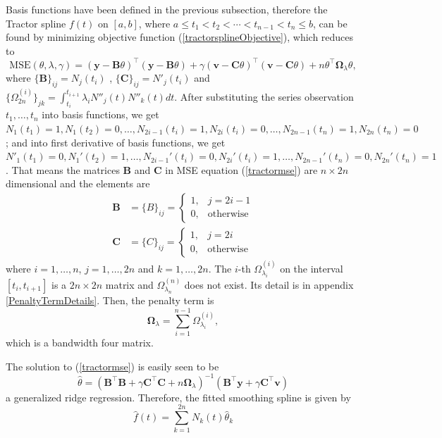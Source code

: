 Basis functions have been defined in the previous subsection, therefore the Tractor spline $f(t)$ on $[a,b]$, where $a \leq t_1 < t_2< \cdots < t_{n-1}<t_n \leq b$, can be found by minimizing  objective function (\ref{tractorsplineObjective}), which reduces to
\begin{equation}\label{tractormse}
\text{MSE}(\theta, \lambda,\gamma) = (\mathbf{y}-\mathbf{B}\theta)^\top (\mathbf{y}-\mathbf{B}\theta) +\gamma (\mathbf{v}-\mathbf{C}\theta)^\top (\mathbf{v}-\mathbf{C}\theta)+n \theta^\top\mathbf{\Omega}_{\lambda}\theta,
\end{equation}
where $\{\mathbf{B}\}_{ij} = N_j(t_i)$ , $\{\mathbf{C}\}_{ij} = N'_j(t_i)$ and $\{\Omega_{2n}^{(i)} \}_{jk}=\int_{t_i}^{t_{i+1}}\lambda_i N''_j(t)N''_k(t)dt$. After substituting the series observation $t_1, \ldots, t_n$ into basis functions, we get $N_1(t_1)=1, N_1(t_2)=0, \ldots, N_{2i-1}(t_{i})=1, N_{2i}(t_{i})=0, \ldots, N_{2n-1}(t_n)=1, N_{2n}(t_n)=0$; and into first derivative of basis functions, we get $N'_1(t_1)=0, N_1'(t_2)=1, \ldots, N_{2i-1}'(t_{i})=0, N_{2i}'(t_{i})=1, \ldots, N_{2n-1}'(t_n)=0, N_{2n}'(t_n)=1$. That means the matrices $\mathbf{B}$ and $\mathbf{C}$ in MSE equation (\ref{tractormse}) are $n \times 2n$ dimensional and the elements are
\begin{align}
\mathbf{B}&=\{B\}_{ij}=\begin{cases}
1, & j=2i-1\\
0, & \mbox{otherwise}
\end{cases}\\
\mathbf{C}&=\{C\}_{ij}=\begin{cases}
1, & j=2i\\
0, & \mbox{otherwise}
\end{cases}
\end{align}
where $i=1, \ldots, n$, $j=1,\ldots,2n$ and $k=1,\ldots,2n$. The $i$-th $\Omega_{\lambda_i}^{(i)}$ on the interval $[t_i,t_{i+1}]$ is a $2n \times 2n$ matrix and $\Omega_{\lambda_n}^{(n)}$ does not exist. Its detail is in appendix \ref{PenaltyTermDetails}. Then, the penalty term is
\begin{equation}
\mathbf{\Omega}_\lambda=\sum_{i=1}^{n-1}\Omega_{\lambda_i}^{(i)},
\end{equation}
which is a bandwidth four matrix.


The solution to (\ref{tractormse}) is easily seen to be
\begin{equation}\label{thetahat}
\hat{\theta}=(\mathbf{B}^\top\mathbf{B}+\gamma\mathbf{C}^\top\mathbf{C}+n\mathbf{\Omega}_{\lambda})^{-1}(\mathbf{B}^\top\mathbf{y}+\gamma\mathbf{C}^\top\mathbf{v})
\end{equation}
a generalized ridge regression. Therefore, the fitted smoothing spline is given by
\begin{equation}
\hat{f}(t)=\sum_{k=1}^{2n}N_k(t)\hat{\theta}_k
\end{equation}

